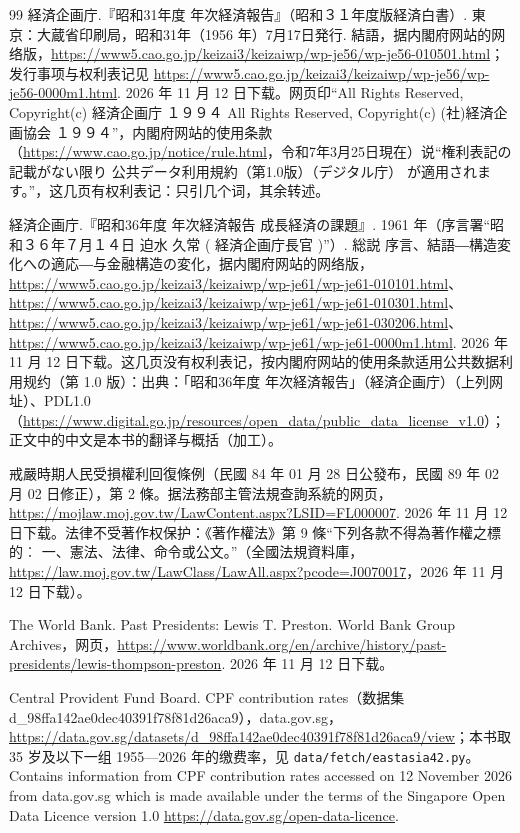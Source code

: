 \begin{thebibliography}{99}
 経済企画庁.『昭和31年度 年次経済報告』（昭和３１年度版経済白書）. 東京：大蔵省印刷局，昭和31年（1956 年）7月17日発行. 結語，据内閣府网站的网络版，\url{https://www5.cao.go.jp/keizai3/keizaiwp/wp-je56/wp-je56-010501.html}；发行事项与权利表记见 \url{https://www5.cao.go.jp/keizai3/keizaiwp/wp-je56/wp-je56-0000m1.html}. 2026 年 11 月 12 日下载。网页印“All Rights Reserved, Copyright(c) 経済企画庁 １９９４ All Rights Reserved, Copyright(c) (社)経済企画協会 １９９４”，内閣府网站的使用条款（\url{https://www.cao.go.jp/notice/rule.html}，令和7年3月25日現在）说“権利表記の記載がない限り 公共データ利用規約（第1.0版）（デジタル庁） が適用されます。”，这几页有权利表记：只引几个词，其余转述。

 経済企画庁.『昭和36年度 年次経済報告 成長経済の課題』. 1961 年（序言署“昭和３６年７月１４日 迫水 久常 ( 経済企画庁長官 )”）. 総説 序言、結語―構造変化への適応―与金融構造の変化，据内閣府网站的网络版，\url{https://www5.cao.go.jp/keizai3/keizaiwp/wp-je61/wp-je61-010101.html}、\url{https://www5.cao.go.jp/keizai3/keizaiwp/wp-je61/wp-je61-010301.html}、\url{https://www5.cao.go.jp/keizai3/keizaiwp/wp-je61/wp-je61-030206.html}、\url{https://www5.cao.go.jp/keizai3/keizaiwp/wp-je61/wp-je61-0000m1.html}. 2026 年 11 月 12 日下载。这几页没有权利表记，按内閣府网站的使用条款适用公共数据利用规约（第 1.0 版）：出典：「昭和36年度 年次経済報告」（経済企画庁）（上列网址）、PDL1.0（\url{https://www.digital.go.jp/resources/open_data/public_data_license_v1.0}）；正文中的中文是本书的翻译与概括（加工）。

 戒嚴時期人民受損權利回復條例（民國 84 年 01 月 28 日公發布，民國 89 年 02 月 02 日修正），第 2 條。据法務部主管法規查詢系統的网页，\url{https://mojlaw.moj.gov.tw/LawContent.aspx?LSID=FL000007}. 2026 年 11 月 12 日下载。法律不受著作权保护：《著作權法》第 9 條“下列各款不得為著作權之標的︰ 一、憲法、法律、命令或公文。”（全國法規資料庫，\url{https://law.moj.gov.tw/LawClass/LawAll.aspx?pcode=J0070017}，2026 年 11 月 12 日下载）。

 The World Bank. Past Presidents: Lewis T. Preston. World Bank Group Archives，网页，\url{https://www.worldbank.org/en/archive/history/past-presidents/lewis-thompson-preston}. 2026 年 11 月 12 日下载。

 Central Provident Fund Board. CPF contribution rates（数据集 d\_98ffa142ae0dec40391f78f81d26aca9），data.gov.sg，\url{https://data.gov.sg/datasets/d_98ffa142ae0dec40391f78f81d26aca9/view}；本书取 35 岁及以下一组 1955—2026 年的缴费率，见 \texttt{data/fetch/eastasia42.py}。Contains information from CPF contribution rates accessed on 12 November 2026 from data.gov.sg which is made available under the terms of the Singapore Open Data Licence version 1.0 \url{https://data.gov.sg/open-data-licence}.


\end{thebibliography}
